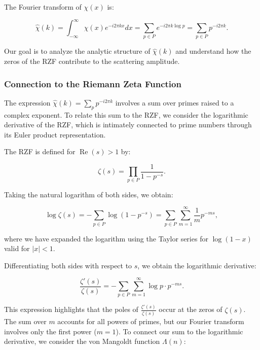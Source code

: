 \documentclass[11pt, oneside]{article}
\begin{document}
The Fourier transform of $\chi(x)$ is:

\begin{equation}
\hat{\chi}(k) = \int_{-\infty}^{\infty} \chi(x) e^{-i 2\pi k x} dx = \sum_{p \in P} e^{-i 2\pi k \log p} = \sum_{p \in P} p^{-i 2\pi k}.
\end{equation}

Our goal is to analyze the analytic structure of $\hat{\chi}(k)$ and understand how the zeros of the RZF contribute to the scattering amplitude.

\subsubsection{Connection to the Riemann Zeta Function}

The expression $\hat{\chi}(k) = \sum_{p} p^{-i 2\pi k}$ involves a sum over primes raised to a complex exponent. To relate this sum to the RZF, we consider the logarithmic derivative of the RZF, which is intimately connected to prime numbers through its Euler product representation.

The RZF is defined for $\operatorname{Re}(s) > 1$ by:

\begin{equation}
\zeta(s) = \prod_{p \in P} \frac{1}{1 - p^{-s}}.
\end{equation}

Taking the natural logarithm of both sides, we obtain:

\begin{equation}
\log \zeta(s) = -\sum_{p \in P} \log\left(1 - p^{-s}\right) = \sum_{p \in P} \sum_{m=1}^\infty \frac{1}{m} p^{-m s},
\end{equation}

where we have expanded the logarithm using the Taylor series for $\log(1 - x)$ valid for $|x| < 1$.

Differentiating both sides with respect to $s$, we obtain the logarithmic derivative:

\begin{equation}
\frac{\zeta'(s)}{\zeta(s)} = -\sum_{p \in P} \sum_{m=1}^\infty \log p \cdot p^{-m s}.
\end{equation}

This expression highlights that the poles of $\frac{\zeta'(s)}{\zeta(s)}$ occur at the zeros of $\zeta(s)$. The sum over $m$ accounts for all powers of primes, but our Fourier transform involves only the first power ($m = 1$). To connect our sum to the logarithmic derivative, we consider the von Mangoldt function $\Lambda(n)$:
\end{document}
